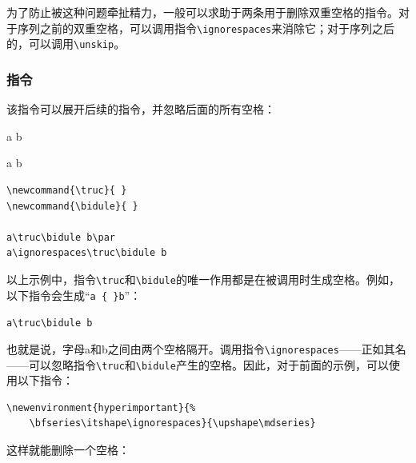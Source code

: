 为了防止被这种问题牵扯精力，一般可以求助于两条用于删除双重空格的指令。对于序列之前的双重空格，可以调用指令\verb+\ignorespaces+来消除它；对于序列之后的，可以调用\verb|\unskip|。

\subsubsection{指令}

该指令可以展开后续的指令，并忽略后面的所有空格：

\begin{codelist}[9.5]{
\newcommand{\truc}{ }
\newcommand{\bidule}{ }

a\truc\bidule b\par
a\ignorespaces\truc\bidule b
}\begin{verbatim}
\newcommand{\truc}{ }
\newcommand{\bidule}{ }

a\truc\bidule b\par
a\ignorespaces\truc\bidule b
\end{verbatim}
\end{codelist}

以上示例中，指令\verb|\truc|和\verb|\bidule|的唯一作用都是在被调用时生成空格。例如，以下指令会生成“\verb*|a { }b|”：

\begin{dmd}
\verb|a\truc\bidule b|
\end{dmd}

也就是说，字母a和b之间由两个空格隔开。调用指令\verb|\ignorespaces|——正如其名——可以忽略指令\verb|\truc|和\verb|\bidule|产生的空格。因此，对于前面的示例，可以使用以下指令：

\begin{dmd}
\begin{verbatim}
\newenvironment{hyperimportant}{% 
    \bfseries\itshape\ignorespaces}{\upshape\mdseries}
\end{verbatim}
\end{dmd}

这样就能删除一个空格：

\renewenvironment{hyperimportant}{%
    \bfseries\itshape\ignorespaces}{\upshape\mdseries}


